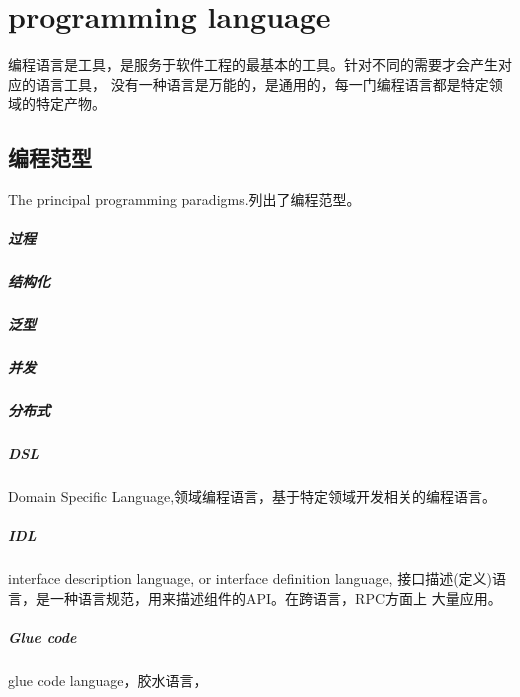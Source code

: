 \chapter{programming language}
编程语言是工具，是服务于软件工程的最基本的工具。针对不同的需要才会产生对应的语言工具，
没有一种语言是万能的，是通用的，每一门编程语言都是特定领域的特定产物。


\section{编程范型}
The principal programming paradigms.\cite{TPPP}列出了编程范型。

\paragraph{过程}

\paragraph{结构化}


\paragraph{泛型}

\paragraph{并发}

\paragraph{分布式}

\paragraph{DSL}
Domain Specific Language,领域编程语言，基于特定领域开发相关的编程语言。

\paragraph{IDL}
interface description language, or interface definition language,
接口描述(定义)语言，是一种语言规范，用来描述组件的API。在跨语言，RPC方面上
大量应用。

\paragraph{Glue code}
glue code language，胶水语言，

